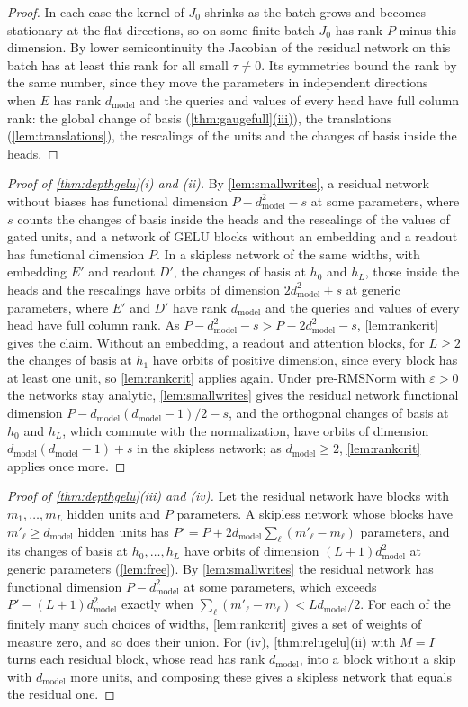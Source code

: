 \documentclass[10pt]{article}
\theoremstyle{definition}
\theoremstyle{remark}
\newcommand{\dm}{d_{\mathrm{model}}}
\DeclareRobustCommand{\cpref}[2]{\hyperref[#1:#2]{\cref*{#1}(#2)}}
\begin{document}
\begin{proof}
In each case the kernel of $J_0$ shrinks as the batch grows and becomes stationary at the flat directions, so on some finite batch $J_0$ has rank $P$ minus this dimension. By lower semicontinuity the Jacobian of the residual network on this batch has at least this rank for all small $\tau \neq 0$. Its symmetries bound the rank by the same number, since they move the parameters in independent directions when $E$ has rank $\dm$ and the queries and values of every head have full column rank: the global change of basis (\cpref{thm:gaugefull}{iii}), the translations (\cref{lem:translations}), the rescalings of the units and the changes of basis inside the heads.
\end{proof}

\begin{proof}[Proof of \cref{thm:depthgelu}(i) and (ii)]
By \cref{lem:smallwrites}, a residual network without biases has functional dimension $P - \dm^2 - s$ at some parameters, where $s$ counts the changes of basis inside the heads and the rescalings of the values of gated units, and a network of GELU blocks without an embedding and a readout has functional dimension $P$. In a skipless network of the same widths, with embedding $E'$ and readout $D'$, the changes of basis at $h_0$ and $h_L$, those inside the heads and the rescalings have orbits of dimension $2\dm^2 + s$ at generic parameters, where $E'$ and $D'$ have rank $\dm$ and the queries and values of every head have full column rank. As $P - \dm^2 - s > P - 2\dm^2 - s$, \cref{lem:rankcrit} gives the claim. Without an embedding, a readout and attention blocks, for $L \ge 2$ the changes of basis at $h_1$ have orbits of positive dimension, since every block has at least one unit, so \cref{lem:rankcrit} applies again. Under pre-RMSNorm with $\varepsilon > 0$ the networks stay analytic, \cref{lem:smallwrites} gives the residual network functional dimension $P - \dm(\dm-1)/2 - s$, and the orthogonal changes of basis at $h_0$ and $h_L$, which commute with the normalization, have orbits of dimension $\dm(\dm-1) + s$ in the skipless network; as $\dm \ge 2$, \cref{lem:rankcrit} applies once more.
\end{proof}

\begin{proof}[Proof of \cref{thm:depthgelu}(iii) and (iv)]
Let the residual network have blocks with $m_1, \dots, m_L$ hidden units and $P$ parameters. A skipless network whose blocks have $m'_\ell \ge \dm$ hidden units has $P' = P + 2\dm\sum_\ell(m'_\ell - m_\ell)$ parameters, and its changes of basis at $h_0, \dots, h_L$ have orbits of dimension $(L+1)\dm^2$ at generic parameters (\cref{lem:free}). By \cref{lem:smallwrites} the residual network has functional dimension $P - \dm^2$ at some parameters, which exceeds $P' - (L+1)\dm^2$ exactly when $\sum_\ell(m'_\ell - m_\ell) < L\dm/2$. For each of the finitely many such choices of widths, \cref{lem:rankcrit} gives a set of weights of measure zero, and so does their union. For (iv), \cpref{thm:relugelu}{ii} with $M = I$ turns each residual block, whose read has rank $\dm$, into a block without a skip with $\dm$ more units, and composing these gives a skipless network that equals the residual one.
\end{proof}
\end{document}
